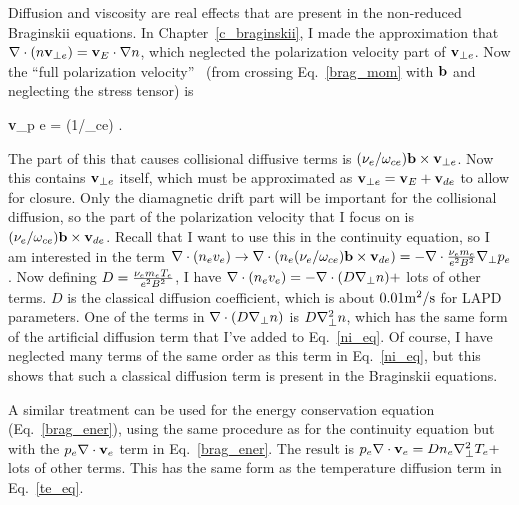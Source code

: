 Diffusion and viscosity are real effects that are present in the non-reduced Braginskii equations. In Chapter~\ref{c_braginskii}, I made the approximation that 
$\nabla \cdot (n {\bf v}_{\perp e}) = {\bf v}_{E} \cdot \nabla n$, which neglected the polarization velocity part of ${\bf v}_{\perp e}$. Now the ``full polarization velocity''~\cite{simakov2003}
(from crossing Eq.~\ref{brag_mom} with ${\bf b}$ and neglecting the stress tensor) is

\beq
\label{e_pol_v}
{\bf v}_{p e} = (1/\omega_{ce}) .
\eeq

The part of this that causes collisional diffusive terms is $ (\nu_{e}/\omega_{ce}) {\bf b \times v}_{\perp e}$. Now this contains ${\bf v}_{\perp e}$ itself, which must be approximated as 
${\bf v}_{\perp e} = {\bf v}_{E} + {\bf v}_{d e}$ to allow for closure. Only the diamagnetic drift part will be important for the collisional diffusion, so the part of the polarization velocity that I
focus on is $(\nu_{e}/\omega_{ce}) {\bf b \times v}_{d e}$. Recall that I want to use this in the continuity equation, so I am interested in the term 
$\nabla \cdot (n_e v_e) \rightarrow \nabla \cdot \left( n_e (\nu_{e}/\omega_{ce}) {\bf b \times v}_{d e} \right) = - \nabla \cdot \frac{\nu_{e} m_e}{e^2 B^2} \nabla_\perp p_e$. Now defining 
$D = \frac{\nu_{e} m_e T_e}{e^2 B^2}$, I have $\nabla \cdot (n_e v_e) = - \nabla \cdot (D \nabla_\perp n) +$ lots of other terms. $D$ is the classical diffusion coefficient, which is about $0.01 {\rm m^2/s}$
for LAPD parameters. One of the terms in $\nabla \cdot (D \nabla_\perp n)$ is $D \nabla_\perp^2 n$, which has the same form of the artificial diffusion term that I've added to Eq.~\ref{ni_eq}. 
Of course, I have neglected many terms of the same order as this term in Eq.~\ref{ni_eq}, but this shows that such a classical diffusion term is present in the Braginskii equations.

A similar treatment can be used for the energy conservation equation (Eq.~\ref{brag_ener}), using the same procedure as for the continuity equation but with the $p_e \nabla \cdot {\bf v}_e$ term in
Eq.~\ref{brag_ener}. The result is $p_e \nabla \cdot {\bf v}_e = D n_e \nabla_\perp^2 T_e +$ lots of other terms. This has the same form as the temperature diffusion term in Eq.~\ref{te_eq}.


